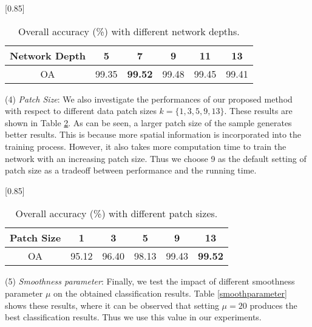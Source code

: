 \documentclass[journal]{IEEEtran}
\begin{document}
		\begin{table}[htp]
			\caption{\label{networkdepth} {{Overall accuracy (\%) with different network depths.}}}
			\begin{center}
				{\normalsize
					\scalebox{0.85}[0.85]
					{
						\begin{tabular}{|c|c|c|c|c|c|}
							\hline
							Network Depth   & 5      & 7   & 9     & 11    & 13 \\
							\hline
							OA              & 99.35  & \bf{99.52} & 99.48 & 99.45  & 99.41 \\
							\hline
						\end{tabular}
					}
				}
			\end{center}
		\end{table}
		
		(4) \textit{Patch Size}: We also investigate the performances of our proposed method with respect to different data patch sizes $k=\{1,3,5,9,13\}$. These results are shown in Table \ref{patchsize}. As can be seen, a larger patch size of the sample generates better results. This is because more spatial information is incorporated into the training process. However, it also takes more computation time to train the network with an increasing patch size. Thus we choose 9 as the default setting of patch size as a tradeoff between performance and the running time.
		
		\begin{table}[htp]
			\caption{\label{patchsize} {{Overall accuracy (\%) with different patch sizes.}}}
			\begin{center}
				{\normalsize
					\scalebox{0.85}[0.85]
					{
						\begin{tabular}{|c|c|c|c|c|c|}
							\hline
							Patch Size   & 1      & 3      & 5     & 9     & 13 \\
							\hline
							OA           & 95.12  & 96.40  & 98.13 & 99.43 & \bf{99.52} \\
							\hline
						\end{tabular}
					}
				}
			\end{center}
		\end{table}
		
		(5) \textit{Smoothness parameter}: Finally, we test the impact of different smoothness parameter $\mu$ on the obtained {{classification}} results. Table \ref{smoothparameter} shows these results, where it can be observed that setting $\mu=20$ produces the best {{classification}} results. Thus we use this value in our experiments.
		
\end{document}
